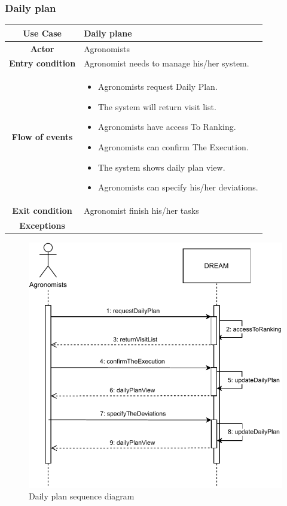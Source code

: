 \documentclass[../../main.tex]{subfiles}
\begin{document}
      \subsubsection{Daily plan}

      \begin{table}[H]
        \centering
          \begin{tabular}{c m{}}
          \hline
          \textbf{Use Case} & Daily plane\\ \hline
          \textbf{Actor} & Agronomists\\ \hline
          \textbf{Entry condition} & Agronomist needs to manage his/her system.\\  \hline
          \textbf{Flow of events} & \begin{itemize}
                                      \item Agronomists request Daily Plan.
                                      \item The system will return visit list.
                                      \item Agronomists have access To Ranking.
                                      \item Agronomists can confirm The Execution.
                                      \item The system shows daily plan view.
                                      \item Agronomists can specify his/her deviations.
                                      
                                    \end{itemize}\\ \hline
          \textbf{Exit condition} & Agronomist finish his/her tasks \\ \hline
          \textbf{Exceptions} & \\ \hline
                              \end{tabular}
      \end{table}

      \begin{figure}[H]
        \centering
        \includegraphics[width=\textwidth]{RASD/image/Sequence_Diagram_Agronomists-DailyPlan.drawio.pdf}
        \caption{Daily plan sequence diagram}
      \end{figure}
\end{document}
